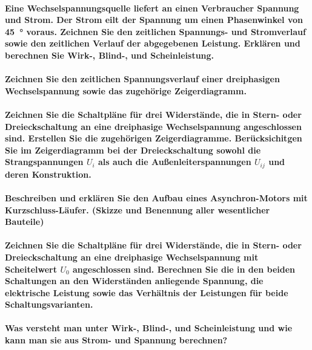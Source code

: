 \documentclass[a4paper, 11pt, parskip=half]{scrartcl}
\begin{document}
\paragraph{Eine Wechselspannungsquelle liefert an einen Verbraucher Spannung und Strom. Der Strom
eilt der Spannung um einen Phasenwinkel von \SI{45}{\degree} voraus. Zeichnen Sie den zeitlichen
Spannungs- und Stromverlauf sowie den zeitlichen Verlauf der abgegebenen Leistung. Erklären und
berechnen Sie Wirk-, Blind-, und Scheinleistung.}

\paragraph{Zeichnen Sie den zeitlichen Spannungsverlauf einer dreiphasigen Wechselspannung sowie das
zugehörige Zeigerdiagramm.}

\paragraph{Zeichnen Sie die Schaltpläne für drei Widerstände, die in Stern- oder Dreieckschaltung an
eine dreiphasige Wechselspannung angeschlossen sind. Erstellen Sie die zugehörigen Zeigerdiagramme.
Berücksichitgen Sie im Zeigerdiagramm bei der Dreieckschaltung sowohl die Strangspannungen $U_i$ als
auch die Außenleiterspannungen $U_{ij}$ und deren Konstruktion.}

\paragraph{Beschreiben und erklären Sie den Aufbau eines Asynchron-Motors mit Kurzschluss-Läufer.
(Skizze und Benennung aller wesentlicher Bauteile)}

\paragraph{Zeichnen Sie die Schaltpläne für drei Widerstände, die in Stern- oder Dreieckschaltung an
eine dreiphasige Wechselspannung mit Scheitelwert $U_0$ angeschlossen sind. Berechnen Sie die in den
beiden Schaltungen an den Widerständen anliegende Spannung, die elektrische Leistung sowie das
Verhältnis der Leistungen für beide Schaltungsvarianten.}

\paragraph{Was versteht man unter Wirk-, Blind-, und Scheinleistung und wie kann man sie aus Strom-
und Spannung berechnen?}
\end{document}
